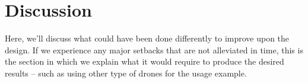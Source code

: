 \section{Discussion}
Here, we'll discuss what could have been done differently to improve upon the design. If we experience any major setbacks that are not alleviated in time, this is the section in which we explain what it would require to produce the desired results -- such as using other type of drones for the usage example.